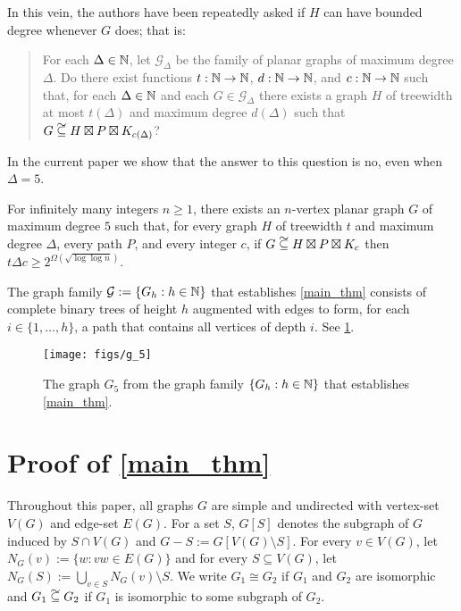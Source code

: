 \documentclass{patmorin}
\newcommand\subsetcong{\mathrel{\text{%
    \setbox0\hbox{$\subseteq$}%
    \rlap{\hbox to \wd0{\hss\hss\hss\raisebox{1.5\height}{$\sim$}\hss}}\box0
}}}
\renewcommand{\ge}{\geqslant}
\begin{document}
In this vein, the authors have been repeatedly asked if $H$ can have bounded degree whenever $G$ does; that is:
\begin{quote}
  For each $\Delta\in\mathbb{N}$, let $\mathcal{G}_\Delta$ be the family of planar graphs of maximum degree $\Delta$.  Do there exist functions $t:\mathbb{N}\to\mathbb{N}$, $d:\mathbb{N}\to\mathbb{N}$, and $c:\mathbb{N}\to\mathbb{N}$ such that, for each $\Delta\in\mathbb{N}$ and each $G\in\mathcal{G}_\Delta$ there exists a graph $H$ of treewidth at most $t(\Delta)$ and maximum degree $d(\Delta)$ such that $G\subsetcong H\boxtimes P\boxtimes K_{c(\Delta)}$?
\end{quote}
In the current paper we show that the answer to this question is no, even when $\Delta=5$.

\begin{thm}\label{main_thm}
  For infinitely many integers $n\ge 1$, there exists an $n$-vertex planar graph $G$ of maximum degree $5$ such that, for every graph $H$ of treewidth $t$ and maximum degree $\Delta$, every path $P$, and every integer $c$, if $G\subsetcong H\boxtimes P\boxtimes K_c$ then $t\Delta c \ge 2^{\Omega(\sqrt{\log\log n})}$.
\end{thm}

The graph family $\mathcal{G}:=\{G_h:h\in\mathbb{N}\}$ that establishes \cref{main_thm} consists of complete binary trees of height $h$ augmented with edges to form, for each $i\in\{1,\ldots,h\}$, a path that contains all vertices of depth $i$.  See \cref{G_5}.

\begin{figure}
  \begin{center}
    \texttt{[image: figs/g\_5]}
  \end{center}
  \caption{The graph $G_5$ from the graph family $\{G_h:h\in\mathbb{N}\}$ that establishes \cref{main_thm}.}
  \label{G_5}
\end{figure}

\section{Proof of \cref{main_thm}}

Throughout this paper, all graphs $G$ are simple and undirected with vertex-set $V(G)$ and edge-set $E(G)$.  For a set $S$, $G[S]$ denotes the subgraph of $G$ induced by $S\cap V(G)$ and $G-S:=G[V(G)\setminus S]$.  For every $v\in V(G)$, let $N_G(v):=\{w:vw\in E(G)\}$ and for every $S\subseteq V(G)$, let $N_G(S):=\bigcup_{v\in S} N_G(v)\setminus S$.  We write $G_1\cong G_2$ if $G_1$ and $G_2$ are isomorphic and $G_1\subsetcong G_2$ if $G_1$ is isomorphic to some subgraph of $G_2$.
\end{document}
